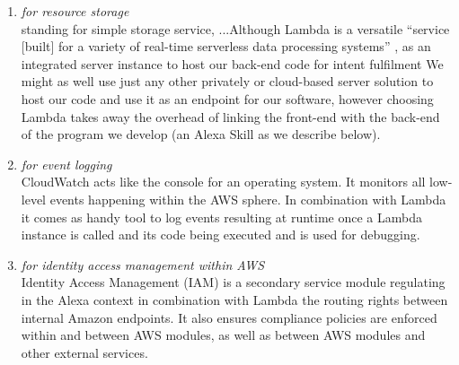 \begin{enumerate}
\item[\href{https://aws.amazon.com/s3/}{\textbf{S3}} \footnote{\url{https://aws.amazon.com/s3}}] \textit{for resource storage}\\
standing for simple storage service, ...Although Lambda is a versatile ``service [built] for a variety of real-time serverless data processing systems'' \cite{aws_website},  as an integrated server instance to host our back-end code for intent fulfilment%
We might as well use just any other privately or cloud-based server solution to host our code and use it as an endpoint for our software, however choosing Lambda takes away the overhead of linking the front-end with the back-end of the program we develop (an Alexa Skill as we describe below). 


	\item[\href{https://aws.amazon.com/iam/}{\textbf{CloudWatch}} \footnote{\url{https://aws.amazon.com/cloudwatch}}]
	\textit{for event logging}\\
	CloudWatch acts like the console for an operating system. It monitors all low-level events happening within the AWS sphere. In combination with Lambda it comes as handy tool to log events resulting at runtime once a Lambda instance is called and its code being executed and is used for debugging.
	
	


	\item[\href{https://aws.amazon.com/iam/}{\textbf{IAM}} \footnote{\url{https://aws.amazon.com/iam}}]
	\textit{for identity access management within AWS}\\
	Identity Access Management (IAM) is a secondary service module regulating in the Alexa context in combination with Lambda the routing rights between internal Amazon endpoints. It also ensures compliance policies are enforced within and between AWS modules, as well as between AWS modules and other external services.
%	
%	



\end{enumerate}

